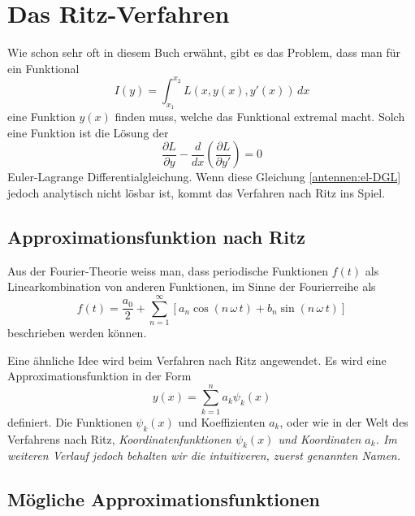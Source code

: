 %
%
% 
%
%

\section{Das Ritz-Verfahren\label{antennen:ritzGrundsätzlich}}

Wie schon sehr oft in diesem Buch erwähnt, gibt es das Problem, dass man für ein Funktional
\begin{equation}
I(y)
=
\int_{x_1}^{x_2}L(x,y(x),y'(x))\,dx
\label{antennen:normalesFunktional}
\end{equation}
eine Funktion $y(x)$ finden muss, welche das Funktional extremal macht.
Solch eine Funktion ist die Lösung der
\begin{equation}
\frac{\partial L}{\partial y} - \frac{d}{dx} \left( \frac{\partial L}{\partial y'} \right) = 0
\label{antennen:el-DGL}
\end{equation}
Euler-Lagrange Differentialgleichung. Wenn diese Gleichung \eqref{antennen:el-DGL} 
jedoch analytisch nicht lösbar ist, kommt das Verfahren nach Ritz ins Spiel.

\subsection{Approximationsfunktion nach Ritz\label{antennen:approxFunkt}}

Aus der Fourier-Theorie weiss man, dass
periodische Funktionen $f(t)$ als Linearkombination von anderen Funktionen, 
im Sinne der Fourierreihe als
\begin{equation}
f(t)
=
\frac{a_0}{2}+\sum_{n=1}^{\infty}[a_n\cos(n \, \omega \, t )+b_n\sin(n \, \omega \, t)]
\label{antennen:fourier}
\end{equation}
beschrieben werden können.

Eine ähnliche Idee wird beim Verfahren nach Ritz angewendet.
Es wird eine Approximationsfunktion in der Form
\begin{equation}
y(x)=\sum_{k=1}^n a_k \psi_k(x)
\label{antennen:ritzFunkt}
\end{equation}
definiert. Die Funktionen $\psi_k(x)$ und Koeffizienten $a_k$, oder
wie in der Welt des Verfahrens nach Ritz,  
\em Koordinatenfunktionen $\psi_k(x)$ \em und \em Koordinaten \em $a_k$.
Im weiteren Verlauf jedoch behalten wir die intuitiveren, zuerst genannten Namen.

\subsection{Mögliche Approximationsfunktionen\label{antennen:approxBsp}}

